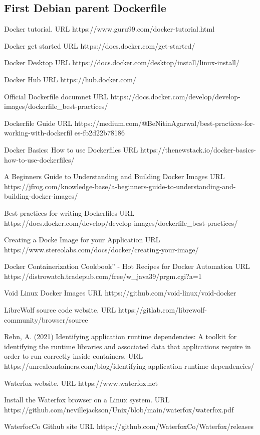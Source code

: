 \documentclass{article}  %
\begin{document}
\subsection{First Debian parent Dockerfile}


\begin{thebibliography}{99}

Docker tutorial.
URL https://www.guru99.com/docker-tutorial.html

Docker get started
URL https://docs.docker.com/get-started/

Docker Desktop
URL https://docs.docker.com/desktop/install/linux-install/

Docker Hub
URL https://hub.docker.com/

Official Dockerfile documnet
URL https://docs.docker.com/develop/develop-images/dockerfile\_best-practices/


Dockerfile Guide
URL https://medium.com/@BeNitinAgarwal/best-practices-for-working-with-dockerfil
es-fb2d22b78186

Docker Basics: How to use Dockerfiles
URL https://thenewstack.io/docker-basics-how-to-use-dockerfiles/

A Beginners Guide to Understanding and Building Docker Images
URL https://jfrog.com/knowledge-base/a-beginners-guide-to-understanding-and-building-docker-images/

Best practices for writing Dockerfiles
URL https://docs.docker.com/develop/develop-images/dockerfile\_best-practices/


Creating a Docke Image for your Application
URL https://www.stereolabs.com/docs/docker/creating-your-image/

Docker Containerization Cookbook” - Hot Recipes for Docker Automation
URL https://distrowatch.tradepub.com/free/w\_java39/prgm.cgi?a=1

Void Linux Docker Images
URL https://github.com/void-linux/void-docker


LibreWolf source code website.
URL https://gitlab.com/librewolf-community/browser/source

Rehn, A. (2021)
Identifying application runtime dependencies: A toolkit for identifying the runtime libraries and associated data that applications require in order to run correctly inside containers. 
URL https://unrealcontainers.com/blog/identifying-application-runtime-dependencies/

Waterfox website. URL https://www.waterfox.net

Install the Waterfox browser on a Linux system. URL https://github.com/nevillejackson/Unix/blob/main/waterfox/waterfox.pdf

WaterfocCo Github site URL https://github.com/WaterfoxCo/Waterfox/releases

\end{thebibliography}
\end{document}
